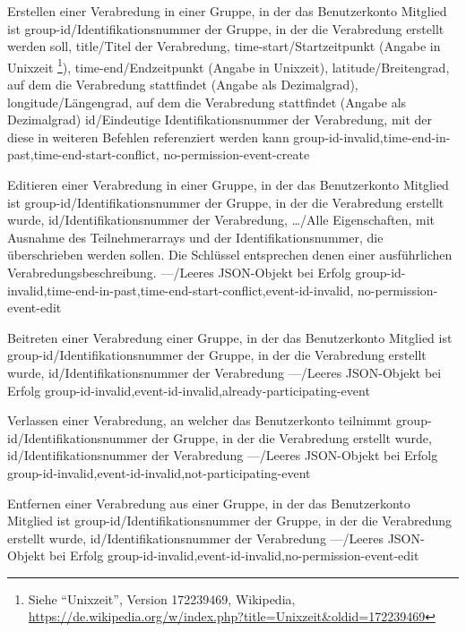\documentclass[parskip=full,11pt]{scrartcl}
\begin{document}
{Erstellen einer Verabredung in einer Gruppe, in der das Benutzerkonto Mitglied
ist}
{group-id/Identifikationsnummer der Gruppe{,} in der die Verabredung erstellt
werden soll,
title/Titel der Verabredung,
time-start/Startzeitpunkt (Angabe in Unixzeit%
\footnote{Siehe \enquote{Unixzeit}, Version 172239469, Wikipedia,\\
\url{https://de.wikipedia.org/w/index.php?title=Unixzeit&oldid=172239469}}),
time-end/Endzeitpunkt (Angabe in Unixzeit),
latitude/Breitengrad{,} auf dem die Verabredung stattfindet (Angabe als
Dezimalgrad),
longitude/Längengrad{,} auf dem die Verabredung stattfindet (Angabe als
Dezimalgrad)}
{id/Eindeutige Identifikationsnummer der Verabredung{,} mit der diese in
weiteren Befehlen referenziert werden kann}
{group-id-invalid,time-end-in-past,time-end-start-conflict,
no-permission-event-create}

{Editieren einer Verabredung in einer Gruppe, in der das Benutzerkonto Mitglied
ist}
{group-id/Identifikationsnummer der Gruppe{,} in der die Verabredung erstellt
wurde,
id/Identifikationsnummer der Verabredung,
\dots/Alle Eigenschaften{,} mit Ausnahme des Teilnehmerarrays und der
Identifikationsnummer{,} die überschrieben werden sollen.
Die Schlüssel entsprechen denen einer ausführlichen Verabredungsbeschreibung.}
{---/Leeres JSON-Objekt bei Erfolg}
{group-id-invalid,time-end-in-past,time-end-start-conflict,event-id-invalid,
no-permission-event-edit}

{Beitreten einer Verabredung einer Gruppe, in der das Benutzerkonto Mitglied
ist}
{group-id/Identifikationsnummer der Gruppe{,} in der die Verabredung erstellt
wurde,
id/Identifikationsnummer der Verabredung}
{---/Leeres JSON-Objekt bei Erfolg}
{group-id-invalid,event-id-invalid,already-participating-event}

{Verlassen einer Verabredung, an welcher das Benutzerkonto teilnimmt}
{group-id/Identifikationsnummer der Gruppe{,} in der die Verabredung erstellt
wurde,
id/Identifikationsnummer der Verabredung}
{---/Leeres JSON-Objekt bei Erfolg}
{group-id-invalid,event-id-invalid,not-participating-event}

{Entfernen einer Verabredung aus einer Gruppe, in der das Benutzerkonto
Mitglied ist}
{group-id/Identifikationsnummer der Gruppe{,} in der die Verabredung erstellt
wurde,
id/Identifikationsnummer der Verabredung}
{---/Leeres JSON-Objekt bei Erfolg}
{group-id-invalid,event-id-invalid,no-permission-event-edit}
\end{document}
